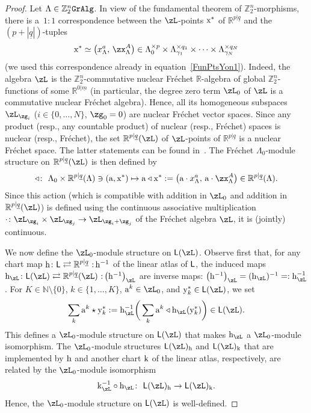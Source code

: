 \documentclass[10pt,a4paper]{amsart}
\newcommand{\catname}[1]{\textnormal{\texttt{#1}}}
\newcommand{\R}{{\mathbb R}}
\newcommand{\Z}{{\mathbb Z}}
\def\ul{\underline}
\def\ul{\underline}
\newcommand{\0}{\otimes}
\newcommand{\z}{\Z_2^n}
\numberwithin{equation}{section}
\begin{document}
\begin{proof}
Let $\Lambda \in \Z_2^n\catname{GrAlg}$. In view of the fundamental theorem of $\z$-morphisms, there is a~$1:1$ correspondence between the $\zL$-points $\rm{x}^*$ of $\R^{p|\ul{q}}$ and the $(p+|\ul{q}|)$-tuples
%
\[
\mathrm{x}^* \simeq \big( {x}^a_\Lambda , \, \zx^A_\Lambda\big)\in {\Lambda}_{0}^{\times p} \times \Lambda_{\gamma_1}^{\times q_1} \times \dots \times \Lambda_{\gamma_N}^{\times q_N}
\]
%
(we used this correspondence already in equation~\eqref{FunPtsYon1}). Indeed, the algebra $\zL$ is the $\Z_2^n$-commutative nuclear Fr\'echet $\R$-algebra of global $\Z_2^n$-functions of some $\R^{0|\ul{m}}$ (in particular, the degree zero term $\zL_0$ of $\zL$ is a commutative nuclear Fr\'echet algebra). Hence, all its homogeneous subspaces $\zL_{\zg_i}$ ($i\in\{0,\dots, N\}$, $\zg_0=0$) are nuclear Fr\'echet vector spaces. Since any product (resp., any countable product) of nuclear (resp., Fr\'echet) spaces is nuclear (resp., Fr\'echet), the set $\R^{p|\ul{q}}(\zL)$ of $\zL$-points of $\R^{p|\ul{q}}$ is a nuclear Fr\'echet space. The latter statements can be found in~\cite{Bruce:2018}. The Fr\'{e}chet $\Lambda_{0}$-module structure on $\R^{p|\ul{q}}(\zL)$ is then defined by
\begin{gather}\label{ActionCompWise}
 \triangleleft\colon\ \Lambda_{0} \times \R^{p|\ul{q}}(\Lambda)\ni (\mathrm{a}, \mathrm{x}^*)\mapsto {\rm a}\triangleleft{\rm x}^*:=\big(\mathrm{a} \cdot x_\Lambda^a, \, \mathrm{a} \cdot \zx_\Lambda^{A} \big)\in\R^{p|\ul{q}}(\Lambda) .
\end{gather}
Since this action (which is compatible with addition in $\zL_0$ and addition in $\R^{p|\ul q}(\zL)$) is defined using the continuous associative multiplication $\cdot\colon \zL_{\zg_i}\times\zL_{\zg_j}\to\zL_{\zg_i+\zg_j}$ of the Fr\'echet algebra $\zL$, it is (jointly) continuous.

We now define the $\zL_0$-module structure on ${\sf L}(\zL)$. Observe first that, for any chart map ${\rm h}\colon {\sf L}\rightleftarrows\R^{p|\ul q}\ {:}\, {\rm h}^{-1}$ of the linear atlas of $\sf L$, the induced maps ${\rm h}_\zL\colon {\sf L}(\zL)\rightleftarrows\R^{p|\ul q}(\zL)\ {:}\,\big({\rm h}^{-1}\big)_\zL$ are inverse maps: $\big({\rm h}^{-1}\big)_\zL=({\rm h}_\zL)^{-1}=:{\rm h}^{-1}_\zL$. For $K\in\mathbb{N}\setminus\{0\}$, $k\in\{1,\dots,K\}$, ${\rm a}^k\in\zL_0$, and ${\rm y}_k^*\in{\sf L}(\zL)$, we set
\[
\sum_k {\rm a}^k\star {\rm y}_k^*:={\rm h}_\zL^{-1}\bigg(\sum_k {\rm a}^k\triangleleft{\rm h}_\zL({\rm y}_k^*)\bigg)\in{\sf L}(\zL).
\]
This defines a $\zL_0$-module structure on ${\sf L}(\zL)$ that makes ${\rm h}_\zL$ a $\zL_0$-module isomorphism. The $\zL_0$-module structures ${\sf L}(\zL)_{\rm h}$ and ${\sf L}(\zL)_{\rm k}$ that are implemented by $\rm h$ and another chart $\rm k$ of the linear atlas, respectively, are related by the $\zL_0$-module isomorphism
\[
{\rm k}_\zL^{-1}\circ {\rm h}_\zL\colon\ {\sf L}(\zL)_{\rm h}\to {\sf L}(\zL)_{\rm k}.
\]
Hence, the $\zL_0$-module structure on ${\sf L}(\zL)$ is well-defined.


\end{proof}
\end{document}
